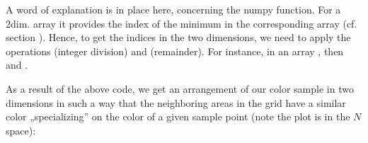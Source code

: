 \documentclass[a4paper,12pt,polish]{jupyterBook}
\begin{document}
\sphinxAtStartPar
A word of explanation is in place here, concerning the numpy  function. For a 2\sphinxhyphen{}dim. array it provides the index of the minimum in the corresponding  array (cf. section {\hyperref[\detokenize{docs/memory:het-lab}]{}}). Hence, to get the indices in the two dimensions, we need to apply the operations \sphinxstylestrong{//} (integer division) and \sphinxstylestrong{\%} (remainder). For instance, in an array , then  and .

\sphinxAtStartPar
As a result of the above code, we get an arrangement of our color sample in two dimensions in such a way that the neighboring areas in the grid have a similar color „specializing” on the color of a given sample point (note the plot is in the \(N\)\sphinxhyphen{}space):
\begin{sphinxVerbatimInput}

\begin{sphinxVerbatim}[commandchars=\\\{\}]

   
       
        \PYG{p}{[}\PYG{p}{]}\PYG{p}{[}\PYG{p}{]} 

\end{sphinxVerbatim}
\end{sphinxVerbatimInput}
\begin{sphinxVerbatimOutput}

\noindent{}
\end{sphinxVerbatimOutput}
\end{document}

